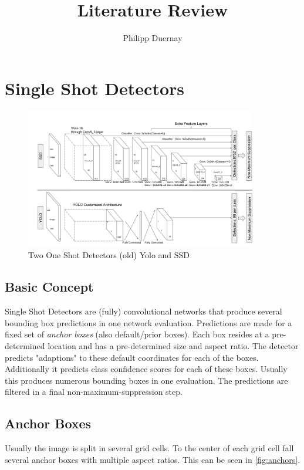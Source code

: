 \documentclass{article}
\begin{document}
	\title{Literature Review}
	\author{Philipp Duernay}
	\maketitle

	\section{Single Shot Detectors}
	\begin{figure}[h]
		\includegraphics[width=0.9\textwidth]{fig/architecture}
		\caption{Two One Shot Detectors (old) Yolo and SSD \cite{Liu}}
		\label{fig:architecture}
	\end{figure}
	
	\subsection{Basic Concept}
	Single Shot Detectors are (fully) convolutional networks that produce several bounding box predictions in one network evaluation. Predictions are made for a fixed set of \textit{anchor boxes} (also default/prior boxes). Each box resides at a pre-determined location and has a pre-determined size and aspect ratio. The detector predicts "adaptions" to these default coordinates for each of the boxes. Additionally it predicts class confidence scores for each of these boxes. Usually this produces numerous bounding boxes in one evaluation. The predictions are filtered in a final non-maximum-suppression step.
	
	\subsection{Anchor Boxes}
	Usually the image is split in several grid cells. To the center of each grid cell fall several anchor boxes with multiple aspect ratios. This can be seen in \autoref{fig:anchors}.
	
\end{document}
